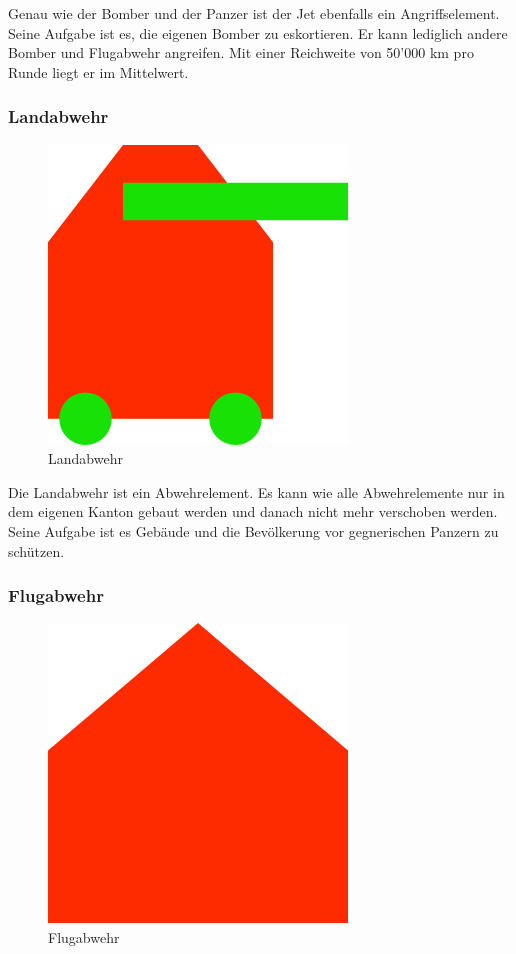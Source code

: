 \documentclass[ngerman, 12pt, pdftex]{scrartcl}[2006/07/30]
\begin{document}
Genau wie der Bomber und der Panzer ist der Jet ebenfalls ein Angriffselement.
Seine Aufgabe ist es, die eigenen Bomber zu eskortieren. Er kann lediglich andere Bomber und Flugabwehr angreifen. Mit einer Reichweite von 50'000 km pro Runde liegt er im Mittelwert.

\newpage

\subsubsection{Landabwehr}


\begin{figure}[h]
\centering
\includegraphics[scale=1.8]{einheiten/Landabwehr.png}
\caption{Landabwehr}
\end{figure}

Die Landabwehr ist ein Abwehrelement. Es kann wie alle Abwehrelemente nur in dem eigenen Kanton gebaut werden und danach nicht mehr verschoben werden. Seine Aufgabe ist es Gebäude und die Bevölkerung vor gegnerischen Panzern zu schützen.


\subsubsection{Flugabwehr}

\begin{figure}[h]
\centering
\includegraphics[scale=18]{einheiten/Flugabwehr.png}
\caption{Flugabwehr}
\end{figure}
\end{document}
